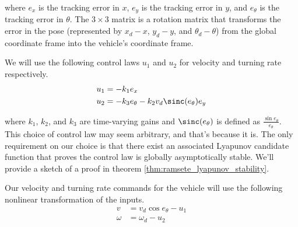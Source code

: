 where $e_x$ is the tracking \gls{error} in $x$, $e_y$ is the tracking
\gls{error} in $y$, and $e_\theta$ is the tracking \gls{error} in $\theta$.
The $3 \times 3$ matrix is a rotation matrix that transforms the \gls{error} in
the \gls{pose} (represented by $x_d - x$, $y_d - y$, and $\theta_d - \theta$)
from the global coordinate frame into the vehicle's coordinate frame.

We will use the following control laws $u_1$ and $u_2$ for velocity and turning
rate respectively.
\begin{equation}
  \begin{aligned}
    u_1 &= -k_1 e_x \\
    u_2 &= -k_3 e_\theta - k_2 v_d \sinc(e_\theta) e_y
  \end{aligned}
  \label{eq:ramsete_u}
\end{equation}

where $k_1$, $k_2$, and $k_3$ are time-varying gains and $\sinc(e_\theta)$ is
defined as $\frac{\sin{e_\theta}}{e_\theta}$. This choice of control law may
seem arbitrary, and that's because it is. The only requirement on our choice is
that there exist an associated Lyapunov candidate function that proves the
control law is globally asymptotically stable. We'll provide a sketch of a proof
in theorem \ref{thm:ramsete_lyapunov_stability}.

Our velocity and turning rate commands for the vehicle will use the following
nonlinear transformation of the inputs.
\begin{align*}
  v &= v_d\cos e_\theta - u_1 \\
  \omega &= \omega_d - u_2
\end{align*}

